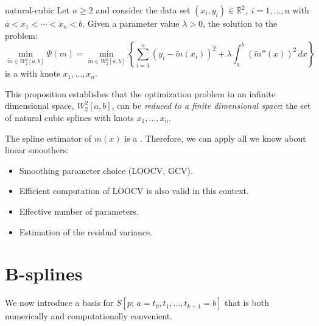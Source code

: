 \begin{prop}{}{natural-cubic}
    Let $n \geq 2$ and consider the data set $(x_i,y_i)\in\mathds R^2,\;i=1,\ldots,n$
    with $a < x_1 < \cdots < x_n < b$. Given a parameter value $\lambda > 0$,
    the solution to the problem:
    \begin{equation*}
        \min_{\tilde m \in W_2^2[a,b]} \Psi(m) = \min_{\tilde m \in W_2^2[a,b]}
        \left\{
            \sum_{i=1}^n \left( y_i - \tilde m(x_i)\right)^2
            + \lambda \int_a^b \left(\tilde m''(x)\right)^2\,dx
            \right\}
    \end{equation*}
    is a  with knots $x_1,\ldots,x_n$.
    \tcblower
    \begin{note}
        This proposition establishes that the optimization problem in an infinite
        dimensional space, $W_2^2[a,b]$, can be \emph{reduced to a finite dimensional
        space}: the set of natural cubic splines with knots $x_1,\ldots,x_n$.
    \end{note}
\end{prop}

The spline estimator of $m(x)$ is a . Therefore,
we can apply all we know about linear smoothers:
\begin{itemize}
    \item Smoothing parameter choice (LOOCV, GCV).
    \item Efficient computation of LOOCV is also valid in this context.
    \item Effective number of parameters.
    \item Estimation of the residual variance.
\end{itemize}

\pagebreak
\section{B-splines}

We now introduce a basis for $S[p;\,a=t_0,t_1,\ldots,t_{k+1}=b]$ that is
both numerically and computationally convenient.

